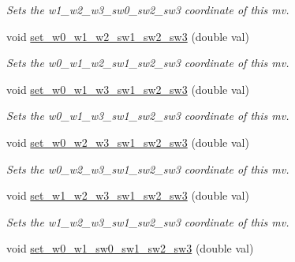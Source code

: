 \begin{DoxyCompactItemize}
\begin{DoxyCompactList}\small\item\em Sets the w1\-\_\-w2\-\_\-w3\-\_\-sw0\-\_\-sw2\-\_\-sw3 coordinate of this mv. \end{DoxyCompactList}\item 
\hypertarget{classe3ga_1_1mv_a55ab76169811eb5d6ec8517b941cbcba}{void \hyperlink{classe3ga_1_1mv_a55ab76169811eb5d6ec8517b941cbcba}{set\-\_\-w0\-\_\-w1\-\_\-w2\-\_\-sw1\-\_\-sw2\-\_\-sw3} (double val)}\label{classe3ga_1_1mv_a55ab76169811eb5d6ec8517b941cbcba}

\begin{DoxyCompactList}\small\item\em Sets the w0\-\_\-w1\-\_\-w2\-\_\-sw1\-\_\-sw2\-\_\-sw3 coordinate of this mv. \end{DoxyCompactList}\item 
\hypertarget{classe3ga_1_1mv_ad21534f35ad129e0c3334ce7eae6362f}{void \hyperlink{classe3ga_1_1mv_ad21534f35ad129e0c3334ce7eae6362f}{set\-\_\-w0\-\_\-w1\-\_\-w3\-\_\-sw1\-\_\-sw2\-\_\-sw3} (double val)}\label{classe3ga_1_1mv_ad21534f35ad129e0c3334ce7eae6362f}

\begin{DoxyCompactList}\small\item\em Sets the w0\-\_\-w1\-\_\-w3\-\_\-sw1\-\_\-sw2\-\_\-sw3 coordinate of this mv. \end{DoxyCompactList}\item 
\hypertarget{classe3ga_1_1mv_a22d45a5f7fd7a7879e0195c3a15aa787}{void \hyperlink{classe3ga_1_1mv_a22d45a5f7fd7a7879e0195c3a15aa787}{set\-\_\-w0\-\_\-w2\-\_\-w3\-\_\-sw1\-\_\-sw2\-\_\-sw3} (double val)}\label{classe3ga_1_1mv_a22d45a5f7fd7a7879e0195c3a15aa787}

\begin{DoxyCompactList}\small\item\em Sets the w0\-\_\-w2\-\_\-w3\-\_\-sw1\-\_\-sw2\-\_\-sw3 coordinate of this mv. \end{DoxyCompactList}\item 
\hypertarget{classe3ga_1_1mv_a56de2beae85ef69072e78d8a58c9c560}{void \hyperlink{classe3ga_1_1mv_a56de2beae85ef69072e78d8a58c9c560}{set\-\_\-w1\-\_\-w2\-\_\-w3\-\_\-sw1\-\_\-sw2\-\_\-sw3} (double val)}\label{classe3ga_1_1mv_a56de2beae85ef69072e78d8a58c9c560}

\begin{DoxyCompactList}\small\item\em Sets the w1\-\_\-w2\-\_\-w3\-\_\-sw1\-\_\-sw2\-\_\-sw3 coordinate of this mv. \end{DoxyCompactList}\item 
\hypertarget{classe3ga_1_1mv_a631e16012bd89de5d38e201b95cc8882}{void \hyperlink{classe3ga_1_1mv_a631e16012bd89de5d38e201b95cc8882}{set\-\_\-w0\-\_\-w1\-\_\-sw0\-\_\-sw1\-\_\-sw2\-\_\-sw3} (double val)}\label{classe3ga_1_1mv_a631e16012bd89de5d38e201b95cc8882}


\end{DoxyCompactItemize}
